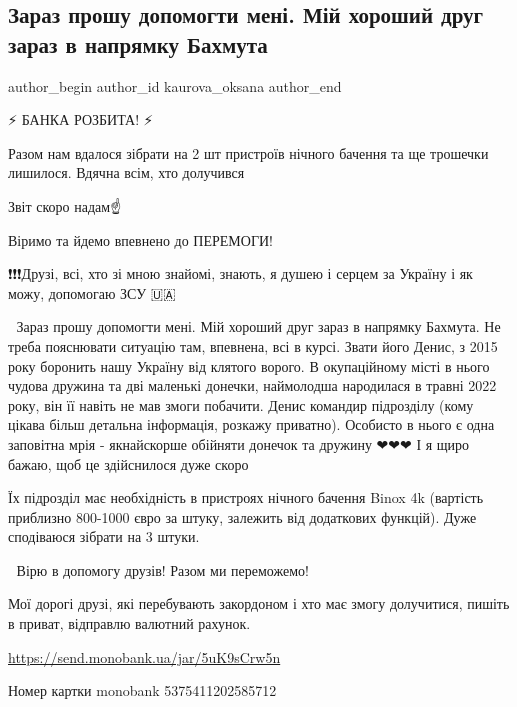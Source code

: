  
 
 
 
 

\subsection{Зараз прошу допомогти мені. Мій хороший друг зараз в напрямку Бахмута}
\label{sec:08_01_2023.fb.kaurova_oksana.1.zaraz_proshu_dopomog}

\ifcmt
 author_begin
   author_id kaurova_oksana
 author_end
\fi

⚡️ БАНКА РОЗБИТА! ⚡️

Разом нам вдалося зібрати на 2 шт пристроїв нічного бачення та ще трошечки
лишилося. Вдячна всім, хто долучився 🙏🙏🙏 

Звіт скоро надам☝️

Віримо та йдемо впевнено до ПЕРЕМОГИ! 💙💛 

❗️❗️❗️Друзі, всі, хто зі мною знайомі, знають, я душею і серцем за Україну і як
можу, допомогаю ЗСУ 🇺🇦

🙏 Зараз прошу допомогти мені. Мій хороший друг зараз в напрямку Бахмута. Не
треба пояснювати ситуацію там, впевнена, всі в курсі. Звати його Денис, з 2015
року боронить нашу Україну від клятого ворого. В окупаційному місті в нього
чудова дружина та дві маленькі донечки, наймолодша народилася в травні 2022
року, він її навіть не мав змоги побачити. Денис командир підрозділу (кому
цікава більш детальна інформація, розкажу приватно). Особисто в нього є одна
заповітна мрія - якнайскорше обійняти донечок та дружину ❤❤❤ І я щиро бажаю,
щоб це здійснилося дуже скоро 

Їх підрозділ має необхідність в пристроях нічного бачення Binox 4k (вартість
приблизно 800-1000 євро за штуку, залежить від додаткових функцій). Дуже
сподіваюся зібрати на 3 штуки. 

🙏 Вірю в допомогу друзів! Разом ми переможемо! 💙💛

Мої дорогі друзі, які перебувають закордоном і хто має змогу долучитися, пишіть
в приват, відправлю валютний рахунок.

\url{https://send.monobank.ua/jar/5uK9sCrw5n}

Номер картки monobank  5375411202585712
